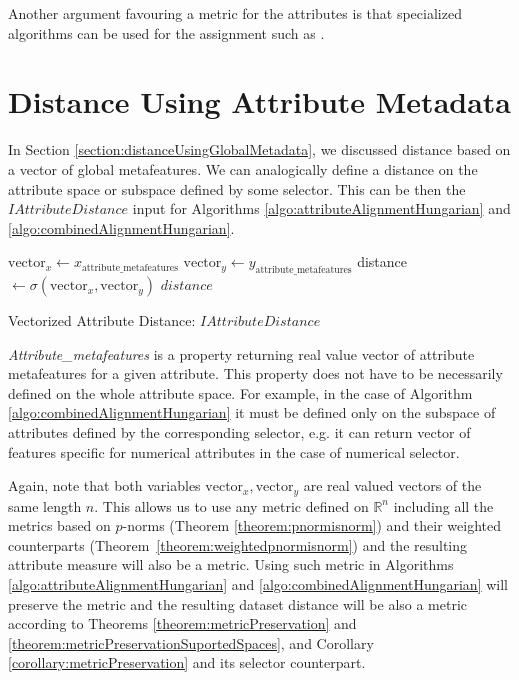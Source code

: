 Another argument favouring a metric for the attributes is that specialized algorithms can be used for the assignment such as \cite{AgarwalApproximateBipartiteMatchingForMetric}.

\section{Distance Using Attribute Metadata}
In Section \ref{section:distanceUsingGlobalMetadata}, we discussed distance based on a vector of global metafeatures. We can analogically define a distance on the attribute space or subspace defined by some selector. This can be then the $IAttributeDistance$ input for Algorithms \ref{algo:attributeAlignmentHungarian} and \ref{algo:combinedAlignmentHungarian}.

\IncMargin{1em}
\begin{algorithm}
\BlankLine
$\text{vector}_x \leftarrow x_{\text{attribute\_metafeatures}}$\;
$\text{vector}_y \leftarrow y_\text{attribute\_metafeatures}$\;
distance $\leftarrow \sigma(\text{vector}_x,\text{vector}_y)$\;
\Return $distance$\;
\caption{Vectorized Attribute Distance: $IAttributeDistance$}\label{algo:basicAttributeDistance}
\end{algorithm}\DecMargin{1em}
\emph{Attribute\_metafeatures} is a property returning real value vector of attribute metafeatures for a given attribute.
This property does not have to be necessarily defined on the whole attribute space. For example, in the case of Algorithm \ref{algo:combinedAlignmentHungarian} it must be defined only on the subspace of attributes defined by the corresponding selector, e.g. it can return vector of features specific for numerical attributes in the case of numerical selector.


Again, note that both variables $\text{vector}_x, \text{vector}_y$ are real valued vectors of the same length $n$. This allows us to use any metric defined on $\mathbb{R}^n$ including all the metrics based on $p$-norms (Theorem \ref{theorem:pnormisnorm}) and their weighted counterparts (Theorem~\ref{theorem:weightedpnormisnorm}) and the resulting attribute measure will also be a metric. Using such metric in Algorithms \ref{algo:attributeAlignmentHungarian} and \ref{algo:combinedAlignmentHungarian} will preserve the metric and the resulting dataset distance will be also a metric according to Theorems \ref{theorem:metricPreservation} and \ref{theorem:metricPreservationSuportedSpaces}, and Corollary \ref{corollary:metricPreservation} and its selector counterpart.

